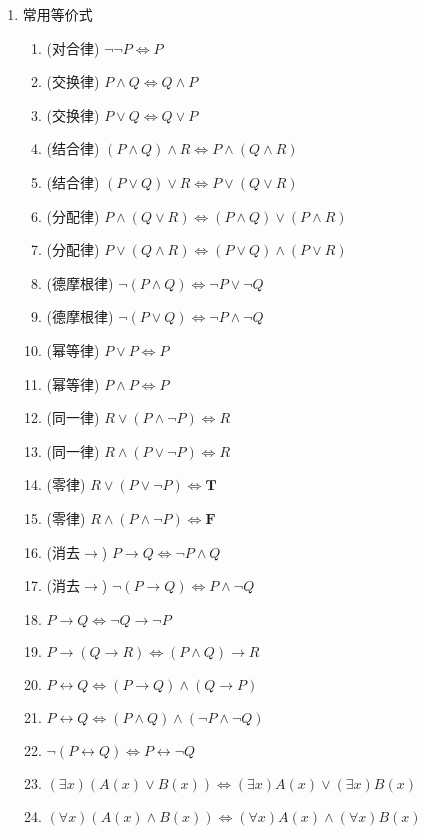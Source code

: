 \documentclass[10pt,a4paper,nofonts]{ctexart}
\begin{document}
\begin{multicols}{2}
\begin{enumerate}
\item 常用等价式
\begin{enumerate}[label={$E_{\arabic*}$}]
\item (对合律) $\neg\neg P \Leftrightarrow P$
\item (交换律) $P\wedge Q \Leftrightarrow Q\wedge P$
\item (交换律) $P\vee Q \Leftrightarrow Q\vee P$
\item (结合律) $(P\wedge Q)\wedge R \Leftrightarrow P\wedge(Q\wedge R)$
\item (结合律) $(P\vee Q)\vee R \Leftrightarrow P\vee(Q\vee R)$
\item (分配律) $P\wedge(Q\vee R) \Leftrightarrow (P\wedge Q)\vee(P\wedge R)$
\item (分配律) $P\vee(Q\wedge R) \Leftrightarrow (P\vee Q)\wedge(P\vee R)$
\item (德摩根律) $\neg(P\wedge Q) \Leftrightarrow \neg P\vee \neg Q$
\item (德摩根律) $\neg(P\vee Q) \Leftrightarrow \neg P\wedge \neg Q$
\item (幂等律) $P\vee P \Leftrightarrow P$
\item (幂等律) $P\wedge P \Leftrightarrow P$
\item (同一律) $R\vee(P\wedge \neg P) \Leftrightarrow R$
\item (同一律) $R\wedge(P\vee \neg P) \Leftrightarrow R$
\item (零律) $R\vee(P\vee \neg P) \Leftrightarrow \bm T$
\item (零律) $R\wedge(P\wedge \neg P) \Leftrightarrow \bm F$
\item (消去$\to$) $P\to Q \Leftrightarrow \neg P\wedge Q$
\item (消去$\to$) $\neg(P\to Q) \Leftrightarrow P\wedge\neg Q$
\item $P\to Q \Leftrightarrow \neg Q\to\neg P$
\item $P\to (Q\to R) \Leftrightarrow (P\wedge Q)\to R$
\item $P\leftrightarrow Q \Leftrightarrow (P\to Q)\wedge(Q\to P)$
\item $P\leftrightarrow Q \Leftrightarrow (P\wedge Q)\wedge(\neg P\wedge \neg Q)$
\item $\neg(P\leftrightarrow Q) \Leftrightarrow P\leftrightarrow\neg Q$
\item $(\exists x)(A(x)\vee B(x)) \Leftrightarrow (\exists x)A(x)\vee(\exists x)B(x)$
\item $(\forall x)(A(x)\wedge B(x)) \Leftrightarrow (\forall x)A(x)\wedge(\forall x)B(x)$

\end{enumerate}
\end{enumerate}
\end{multicols}
\end{document}
